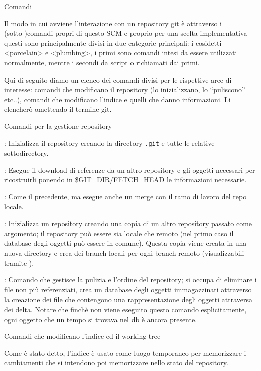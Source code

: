 \capitolo Comandi

Il modo in cui avviene l'interazione con un repository git \`e attraverso i
(sotto-)comandi propri di questo SCM e proprio per una scelta implementativa
questi sono principalmente divisi in due categorie principali: i cosidetti
\evidenzia<porcelain> e \evidenzia<plumbing>, i primi sono comandi intesi da
essere utilizzati normalmente, mentre i secondi da script o richiamati dai primi.

Qui di seguito diamo un elenco dei comandi divisi per le rispettive aree di
interesse: comandi che modificano il repository (lo inizializzano, lo
``puliscono'' etc..), comandi che modificano l'indice e quelli che danno
informazioni. Li elencher\`o omettendo il termine git.

\sezione Comandi per la gestione repository

\elemento{}: Inizializza il repository creando la directory {\tt .git}
e tutte le relative sottodirectory.

\elemento{}: Esegue il download di referenze da un altro
repository e gli oggetti necessari per ricostruirli ponendo in
\url{$GIT_DIR/FETCH_HEAD} le informazioni necessarie.

\elemento{}: Come il precedente, ma esegue anche un merge con il ramo
di lavoro del repo locale.

\elemento {}: Inizializza un repository creando una copia di un altro
repository passato come argomento; il repository pu\`o essere sia locale che
remoto (nel primo caso il database degli oggetti pu\`o essere in comune).
Questa copia viene creata in una nuova directory e crea dei branch locali per
ogni branch remoto (visualizzabili tramite ).

\elemento {}: Comando che gestisce la pulizia e l'ordine del repository;
si occupa di eliminare i file non pi\`u referenziati, crea un database degli
oggetti immagazzinati attraverso la creazione dei file  che
contengono una rappresentazione degli oggetti attraversa dei delta. Notare che
finch\`e non viene eseguito questo comando esplicitamente, ogni oggetto che un
tempo si trovava nel db \`e ancora presente.

\sezione Comandi che modificano l'indice ed il working tree

Come \`e stato detto, l'indice \`e usato come luogo temporaneo per memorizzare i
cambiamenti che si intendono poi memorizzare nello stato del repository.


